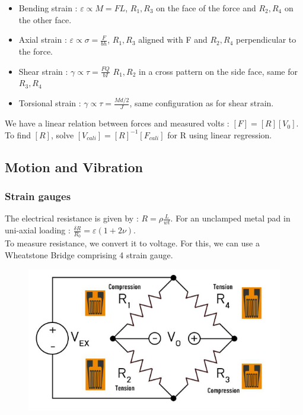 \documentclass[../main.tex]{subfiles}
\begin{document}
\begin{itemize}
    \item Bending strain : $\varepsilon \propto M = FL$, $R_1, R_3$ on the face of the force and $R_2, R_4$ on the other face.\\
    \item Axial strain : $\varepsilon \propto \sigma = \frac{F}{bh}$, $R_1, R_3$ aligned with F and $R_2, R_4$ perpendicular to the force.\\
    \item Shear strain : $\gamma \propto \tau = \frac{FQ}{bI}$ $R_1,R_2$ in a cross pattern on the side face, same for $R_3, R_4$\\
    \item Torsional strain : $\gamma \propto \tau = \frac{Md/2}{J}$, same configuration as for shear strain.\\
\end{itemize}

We have a linear relation between forces and measured volts : $[F] = [R] [V_0]$.\\
To find $[R]$, solve $[V_{cali}] = [R]^{-1} [F_{cali}]$ for R using linear regression.

\subsection{Motion and Vibration}
\subsubsection{Strain gauges}
The electrical resistance is given by : $R = \rho \frac{L}{w t}$. For an unclamped metal pad in uni-axial loading : $\frac{\delta R}{R_0} = \varepsilon (1+2\nu)$.\\
To measure resistance, we convert it to voltage. For this, we can use a Wheatstone Bridge comprising 4 strain gauge.

\begin{figure}[hbt!]
    \centering
    \includegraphics[width = .5\textwidth]{IMAGES/mecavib/Screenshot from 2024-06-08 12-12-52.png}
\end{figure}
\end{document}
